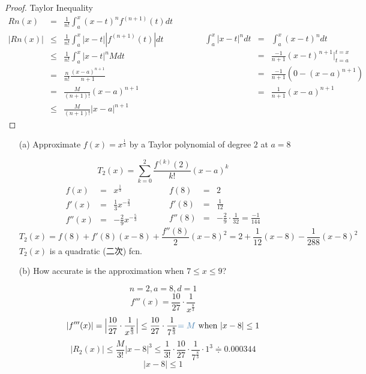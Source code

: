 \begin{proof} Taylor Inequality
\[\begin{array}{rcl}
Rn(x) & = & \displaystyle \frac{1}{n!} \int^x_a (x - t)^n f^{(n + 1)}(t)dt\\
|Rn(x)| & \leq & \displaystyle \frac{1}{n!} \int^x_a |x - t||f^{(n + 1)}(t)|dt\\
& \leq & \displaystyle \frac{1}{n!} \int^x_a |x - t|^n Mdt\\
& = & \displaystyle \frac{n}{n!} \frac{(x - a)^{n + 1}}{n + 1}\\
& = & \displaystyle \frac{M}{(n + 1)!} (x - a)^{n + 1}\\
& \leq & \displaystyle \frac{M}{(n + 1)!} |x - a|^{n + 1}
\end{array} \quad \quad \quad
\begin{array}{rcl}
\displaystyle \int^x_a |x - t|^n dt & = & \displaystyle \int^x_a (x - t)^n dt\\
& = & \displaystyle \frac{-1}{n + 1} (x - t)^{n + 1} \Big|^{t = x}_{t = a}\\
& = & \displaystyle \frac{-1}{n + 1} (0 - (x - a)^{n + 1})\\
& = & \displaystyle \frac{1}{n + 1} (x - a)^{n + 1}
\end{array}\]
\end{proof}

\begin{eg}
\begin{itemize}
\item[(a)] Approximate \(f(x) = x^{\frac{1}{3}}\) by a Taylor polynomial of degree \(2\) at \(a = 8\)

\soln
\[T_2(x) = \displaystyle \sum^2_{k = 0} \frac{f^{(k)}(2)}{k!} (x - a)^k\]
\[\begin{array}{rcl}
f(x) & = & \displaystyle x^{\frac{1}{3}}\\
f'(x) & = & \displaystyle \frac{1}{3} x^{-\frac{2}{3}}\\
f''(x) & = & \displaystyle - \frac{2}{9}x^{-\frac{5}{3}}
\end{array} \quad \quad \quad
\begin{array}{rcl}
f(8) & = & 2\\
f'(8) & = & \displaystyle \frac{1}{12}\\
f''(8) & = & \displaystyle - \frac{2}{9} \cdot \frac{1}{32} = \frac{-1}{144}
\end{array}\]
\[\displaystyle T_2 (x) = f(8) + f'(8)(x - 8) + \frac{f''(8)}{2} (x -8)^2 = 2 + \frac{1}{12} (x - 8) - \frac{1}{288}(x - 8)^2\]
\(T_2(x)\) is a quadratic (二次) fcn.
\item[(b)] How accurate is the approximation when \(7 \leq x \leq 9\)?

\soln
\[n = 2, a = 8, d = 1\]
\[\displaystyle f'''(x) = \frac{10}{27} \cdot \frac{1}{x^{\frac{8}{3}}}\]
\[\displaystyle |f'''(x)| = \Big| \frac{10}{27} \cdot \frac{1}{x^{\frac{8}{3}}} \Big| \leq \frac{10}{27} \cdot \frac{1}{7^{\frac{8}{3}}} \tssteelblue{= M} \text{ when } |x - 8| \leq 1\]
\[\displaystyle |R_2(x)| \leq \frac{M}{3!} |x - 8|^3 \leq \frac{1}{3!} \cdot \frac{10}{27} \cdot \frac{1}{7^{\frac{8}{3}}} \cdot 1^3 \Doteq 0.000344\]
\[|x - 8| \leq 1\]
\end{itemize} 
\end{eg}

